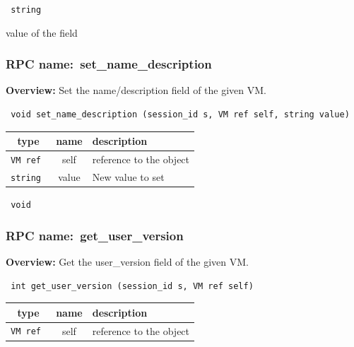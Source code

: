 {\tt 
string
}


value of the field
\vspace{0.3cm}
\vspace{0.3cm}
\vspace{0.3cm}
\subsubsection{RPC name:~set\_name\_description}

{\bf Overview:} 
Set the name/description field of the given VM.

\begin{verbatim} void set_name_description (session_id s, VM ref self, string value)\end{verbatim}



 
\vspace{0.3cm}
\begin{tabular}{|c|c|p{7cm}|}
 \hline
{\bf type} & {\bf name} & {\bf description} \\ \hline
{\tt VM ref } & self & reference to the object \\ \hline 

{\tt string } & value & New value to set \\ \hline 

\end{tabular}

\vspace{0.3cm}

{\tt 
void
}



\vspace{0.3cm}
\vspace{0.3cm}
\vspace{0.3cm}
\subsubsection{RPC name:~get\_user\_version}

{\bf Overview:} 
Get the user\_version field of the given VM.

\begin{verbatim} int get_user_version (session_id s, VM ref self)\end{verbatim}



 
\vspace{0.3cm}
\begin{tabular}{|c|c|p{7cm}|}
 \hline
{\bf type} & {\bf name} & {\bf description} \\ \hline
{\tt VM ref } & self & reference to the object \\ \hline 

\end{tabular}

